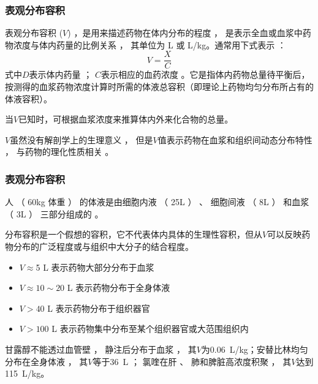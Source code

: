 \documentclass[dvipsnames, svgnames, x11names]{beamer}
\begin{document}
\begin{frame}
    \frametitle{表观分布容积}
    表观分布容积 ($V$) ，是用来描述药物在体内分布的程度 ， 是表示全血或血浆中药物浓度与体内药量的比例关系 ， 其单位为 L 或 L/kg。通常用下式表示 ：
    \[
        V=\frac{X}{C}
    \]
    式中$D$表示体内药量 ； $C$表示相应的血药浓度 。它是指体内药物总量待平衡后，按测得的血浆药物浓度计算时所需的体液总容积（即理论上药物均匀分布所占有的体液容积）。

    当$V$已知时，可根据血浆浓度来推算体内外来化合物的总量。

    $V$虽然没有解剖学上的生理意义 ， 但是$V$值表示药物在血浆和组织间动态分布特性 ， 与药物的理化性质相关 。 
\end{frame}


\begin{frame}
    \frametitle{表观分布容积}
    人 （ 60kg 体重 ） 的体液是由细胞内液 （ 25L ） 、 细胞间液 （ 8L ） 和血浆 （ 3L ） 三部分组成的 。

    分布容积是一个假想的容积，它不代表体内具体的生理性容积，但从$V$可以反映药物分布的广泛程度或与组织中大分子的结合程度。
    \begin{itemize}
      \item $V\approx$5 L 表示药物大部分分布于血浆
      \item $V\approx 10 \sim 20$ L 表示药物分布于全身体液
      \item $V>40$ L 表示药物分布于组织器官
      \item $V>100$ L 表示药物集中分布至某个组织器官或大范围组织内
    \end{itemize}
    \begin{blankblock}{}
        甘露醇不能透过血管壁 ， 静注后分布于血浆 ， 其$V$为\SI{0.06}{L/kg}；安替比林均匀分布在全身体液 ， 其$V$等于\SI{36}{L} ； 氯喹在肝 、 肺和脾脏高浓度积聚 ， 其$V$达到\SI{115}{L/kg}。
    \end{blankblock}
\end{frame}
\end{document}

